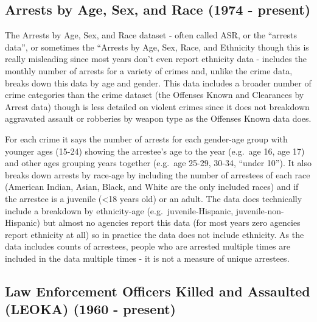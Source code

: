 \documentclass[
]{krantz}
\begin{document}
\subsection{Arrests by Age, Sex, and Race (1974 -
present)}\label{arrests-by-age-sex-and-race-1974---present}

The Arrests by Age, Sex, and Race dataset - often called
ASR, or the ``arrests data'', or sometimes the ``Arrests by
Age, Sex, Race, and Ethnicity though this is really
misleading since most years don't even report ethnicity data
- includes the monthly number of arrests for a variety of
crimes and, unlike the crime data, breaks down this data by
age and gender. This data includes a broader number of crime
categories than the crime dataset (the Offenses Known and
Clearances by Arrest data) though is less detailed on
violent crimes since it does not breakdown aggravated
assault or robberies by weapon type as the Offenses Known
data does.

For each crime it says the number of arrests for each
gender-age group with younger ages (15-24) showing the
arrestee's age to the year (e.g.~age 16, age 17) and other
ages grouping years together (e.g.~age 25-29, 30-34, ``under
10''). It also breaks down arrests by race-age by including
the number of arrestees of each race (American Indian,
Asian, Black, and White are the only included races) and if
the arrestee is a juvenile (\textless18 years old) or an
adult. The data does technically include a breakdown by
ethnicity-age (e.g.~juvenile-Hispanic,
juvenile-non-Hispanic) but almost no agencies report this
data (for most years zero agencies report ethnicity at all)
so in practice the data does not include ethnicity. As the
data includes counts of arrestees, people who are arrested
multiple times are included in the data multiple times - it
is not a measure of unique arrestees.

\subsection{Law Enforcement Officers Killed and Assaulted
(LEOKA) (1960 -
present)}\label{law-enforcement-officers-killed-and-assaulted-leoka-1960---present}
\end{document}
